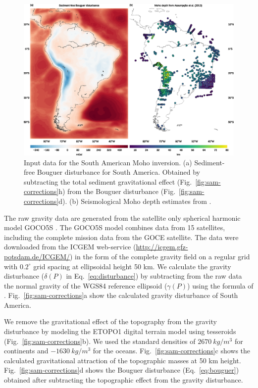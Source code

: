 \documentclass[extra]{gji}
\begin{document}
\begin{figure}
    \centering
    \includegraphics[width=\textwidth]{figures/south-america-data}
    \caption{
        Input data for the South American Moho inversion.
        (a) Sediment-free Bouguer disturbance for South America.
        Obtained by subtracting the total sediment gravitational effect
        (Fig.~\ref{fig:sam-corrections}h) from the Bouguer disturbance
        (Fig.~\ref{fig:sam-corrections}d).
        (b) Seismological Moho depth estimates from
        \citet{assumpcao2012}.
    }
    \label{fig:sam-data}
\end{figure}


The raw gravity data are generated from the satellite only
spherical harmonic model GOCO5S \citet{mayer-guerr2015}.
The GOCO5S model combines data from 15 satellites, including the complete
mission data from the GOCE satellite.
The data were downloaded from the ICGEM web-service
(\url{http://icgem.gfz-potsdam.de/ICGEM/})
in the form of the complete gravity field
on a regular grid with $0.2^\circ$ grid spacing at ellipsoidal height 50 km.
We calculate the gravity disturbance
($\delta(P)$ in Eq.~\ref{eq:disturbance})
by subtracting from the raw data
the normal gravity of the WGS84 reference ellipsoid ($\gamma(P)$)
using the formula of \citet{li2001a}.
Fig.~\ref{fig:sam-corrections}a show the calculated gravity disturbance of
South America.

We remove the gravitational effect of the topography
from the gravity disturbance
by modeling the ETOPO1 digital terrain model
\citep[][ \url{http://dx.doi.org/10.7289/V5C8276M}]{amante2009}
using tesseroids (Fig.~\ref{fig:sam-corrections}b).
We used the standard densities of $2670\ kg/m^3$ for continents and
$-1630\ kg/m^3$ for the oceans.
Fig.~\ref{fig:sam-corrections}c shows the calculated gravitational attraction
of the topographic masses at 50 km height.
Fig.~\ref{fig:sam-corrections}d shows the Bouguer disturbance
(Eq.~\ref{eq:bouguer}) obtained after subtracting the topographic effect from
the gravity disturbance.
\end{document}
